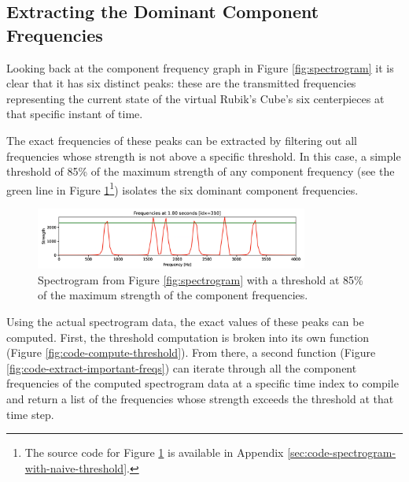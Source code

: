 \subsection{Extracting the Dominant Component Frequencies}
\label{subsec:extract-dominant-freqs}
Looking back at the component frequency graph in Figure \ref{fig:spectrogram} it is clear that it has six distinct peaks: these are the transmitted frequencies representing the current state of the virtual Rubik's Cube's six centerpieces at that specific instant of time.

The exact frequencies of these peaks can be extracted by filtering out all frequencies whose strength is not above a specific threshold.
In this case, a simple threshold of 85\% of the maximum strength of any component frequency (see the green line in Figure \ref{fig:spectrogram-with-naive-threshold}\footnote{The source code for Figure \ref{fig:spectrogram-with-naive-threshold} is available in Appendix \ref{sec:code-spectrogram-with-naive-threshold}.}) isolates the six dominant component frequencies.

\begin{figure}[h]
    \centering
    \caption{Spectrogram from Figure \ref{fig:spectrogram} with a threshold at 85\% of the maximum strength of the component frequencies. }
    \label{fig:spectrogram-with-naive-threshold}
    \includegraphics[width=0.8\textwidth]{Figures/5 Algorithm Design/threshold.png}
\end{figure}

Using the actual spectrogram data, the exact values of these peaks can be computed.
First, the threshold computation is broken into its own function (Figure \ref{fig:code-compute-threshold}).
From there, a second function (Figure \ref{fig:code-extract-important-freqs}) can iterate through all the component frequencies of the computed spectrogram data at a specific time index to compile and return a list of the frequencies whose strength exceeds the threshold at that time step.

